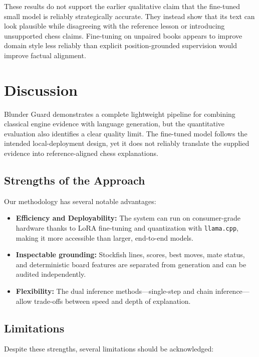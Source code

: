 \documentclass[sigconf,nonacm]{acmart}
\begin{document}
These results do not support the earlier qualitative claim that the fine-tuned small model is reliably strategically accurate. They instead show that its text can look plausible while disagreeing with the reference lesson or introducing unsupported chess claims. Fine-tuning on unpaired books appears to improve domain style less reliably than explicit position-grounded supervision would improve factual alignment.

\section{Discussion}
\label{sec:discussion}
Blunder Guard demonstrates a complete lightweight pipeline for combining classical engine evidence with language generation, but the quantitative evaluation also identifies a clear quality limit. The fine-tuned model follows the intended local-deployment design, yet it does not reliably translate the supplied evidence into reference-aligned chess explanations.

\subsection{Strengths of the Approach}

Our methodology has several notable advantages:

\begin{itemize}
    \item \textbf{Efficiency and Deployability:} The system can run on consumer-grade hardware thanks to LoRA fine-tuning and quantization with \texttt{llama.cpp}, making it more accessible than larger, end-to-end models.
    \item \textbf{Inspectable grounding:} Stockfish lines, scores, best moves, mate status, and deterministic board features are separated from generation and can be audited independently.
    \item \textbf{Flexibility:} The dual inference methods—single-step and chain inference—allow trade-offs between speed and depth of explanation.
\end{itemize}

\subsection{Limitations}

Despite these strengths, several limitations should be acknowledged:
\end{document}

